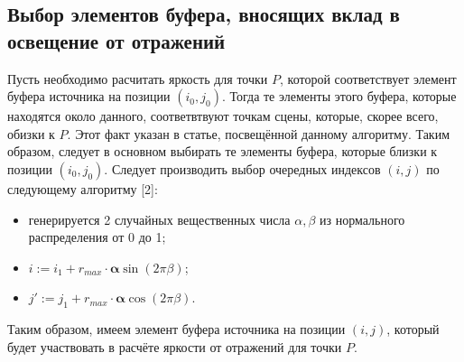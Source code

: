 {{        \subsection{Выбор элементов буфера, вносящих вклад в освещение от отражений} {
            Пусть необходимо расчитать яркость для точки $P$, которой соответствует
            элемент буфера источника на позиции $(i_0, j_0)$.
            Тогда те элементы этого буфера, которые находятся около данного,
            соответвтвуют точкам сцены, которые, скорее всего, обизки к $P$.
            Этот факт указан в статье, посвещённой данному алгоритму.
            Таким образом, следует в основном выбирать те элементы буфера,
            которые близки к позиции $(i_0, j_0)$.
            Следует производить выбор очередных индексов $(i, j)$
            по следующему алгоритму [2]:
            \begin{itemize}
                \item
                    генерируется 2 случайных вещественных числа
                    $\alpha, \beta$ из нормального распределения от 0 до 1;
                \item $i := i_1 + r_{max} \cdot \mathbf{\alpha} \sin(2\pi\beta)$;
                \item $j' := j_1 + r_{max} \cdot \mathbf{\alpha} \cos(2\pi\beta)$.
            \end{itemize}
            Таким образом, имеем элемент буфера источника на позиции $(i, j)$,
            который будет участвовать в расчёте яркости от отражений для точки $P$.
        }
    }
}